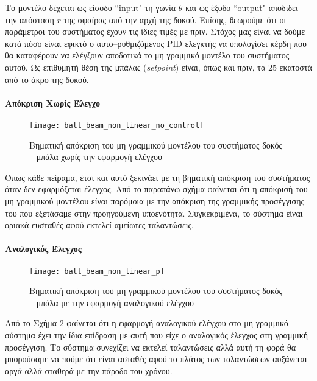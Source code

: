Το μοντέλο δέχεται ως είσοδο ``input" τη γωνία $\theta$ και ως έξοδο ``output" αποδίδει την απόσταση $r$ της σφαίρας από την αρχή της δοκού. Επίσης, θεωρούμε ότι οι παράμετροι του συστήματος έχουν τις ίδιες τιμές με πριν. Στόχος μας είναι να δούμε κατά πόσο είναι εφικτό ο αυτο--ρυθμιζόμενος PID ελεγκτής να υπολογίσει κέρδη που θα καταφέρουν να ελέγξουν αποδοτικά το μη γραμμικό μοντέλο του συστήματος αυτού. Ως επιθυμητή θέση της μπάλας (\emph{setpoint}) είναι, όπως και πριν, τα $25$ εκατοστά από το άκρο της δοκού.

\paragraph{Απόκριση Χωρίς Έλεγχο}\hfill

\begin{figure}[H]
  \centering
  \texttt{[image: ball\_beam\_non\_linear\_no\_control]}
  \caption{Βηματική απόκριση του μη γραμμικού μοντέλου του συστήματος δοκός -- μπάλα χωρίς την εφαρμογή ελέγχου}
  \label{fig:ball_beam_non_linear_no_control}
\end{figure}

Όπως κάθε πείραμα, έτσι και αυτό ξεκινάει με τη βηματική απόκριση του συστήματος όταν δεν εφαρμόζεται έλεγχος. Από το παραπάνω σχήμα φαίνεται ότι η απόκρισή του μη γραμμικού μοντέλου είναι παρόμοια με την απόκριση της γραμμικής προσέγγισης του που εξετάσαμε στην προηγούμενη υποενότητα. Συγκεκριμένα, το σύστημα είναι οριακά ευσταθές αφού εκτελεί αμείωτες ταλαντώσεις.\newpage

\paragraph{Αναλογικός Έλεγχος}\hfill

\begin{figure}[h]
  \centering
  \texttt{[image: ball\_beam\_non\_linear\_p]}
  \caption{Βηματική απόκριση του μη γραμμικού μοντέλου του συστήματος δοκός -- μπάλα με την εφαρμογή αναλογικού ελέγχου}
  \label{fig:ball_beam_non_linear_p}
\end{figure}

Από το Σχήμα \ref{fig:ball_beam_non_linear_p} φαίνεται ότι η εφαρμογή αναλογικού ελέγχου στο μη γραμμικό σύστημα έχει την ίδια επίδραση με αυτή που είχε ο αναλογικός έλεγχος στη γραμμική προσέγγιση. Το σύστημα συνεχίζει να εκτελεί ταλαντώσεις αλλά αυτή τη φορά θα μπορούσαμε να πούμε ότι είναι ασταθές αφού το πλάτος των ταλαντώσεων αυξάνεται αργά αλλά σταθερά με την πάροδο του χρόνου.

